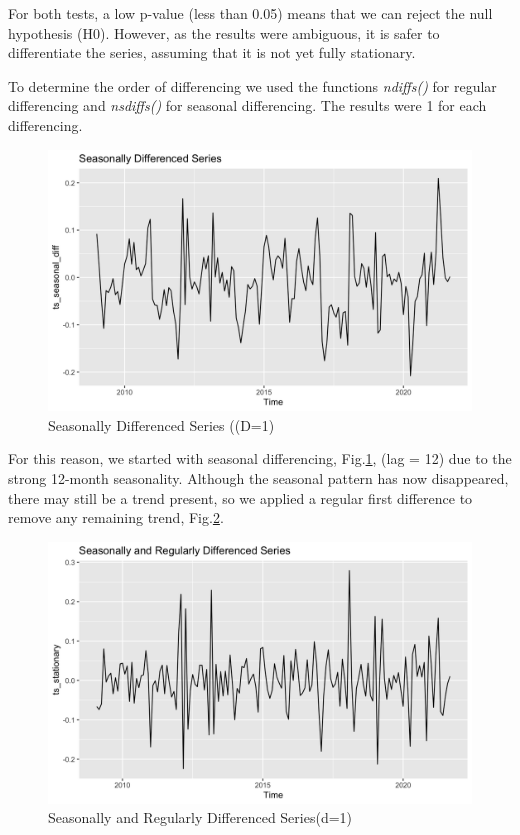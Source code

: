 \vspace{0.5\baselineskip}

For both tests, a low p-value (less than 0.05) means that we can reject the null hypothesis (H0).
However, as the results were ambiguous, it is safer to differentiate the series, assuming that it is not yet fully stationary.

\vspace{0.5\baselineskip}

To determine the order of differencing we used the functions \textit{ndiffs()} for regular differencing and \textit{nsdiffs()} for seasonal differencing. The results were 1 for each differencing.

\begin{figure}[H]
    \centering
    \includegraphics[width=0.9\linewidth]{images/seasonali_diff.png}
    \caption{Seasonally Differenced Series ((D=1)}
    \label{fig:seasonali_diff}
\end{figure}

For this reason, we started with seasonal differencing, Fig.\ref{fig:seasonali_diff}, (lag = 12) due to the strong 12-month seasonality.
Although the seasonal pattern has now disappeared, there may still be a trend present, so we applied a regular first difference to remove any remaining trend, Fig.\ref{fig:seasonaly_regulary}.

\begin{figure}[H]
    \centering
    \includegraphics[width=0.9\linewidth]{images/seasonaly_regulary.png}
    \caption{Seasonally and Regularly Differenced Series(d=1)}
    \label{fig:seasonaly_regulary}
\end{figure}


